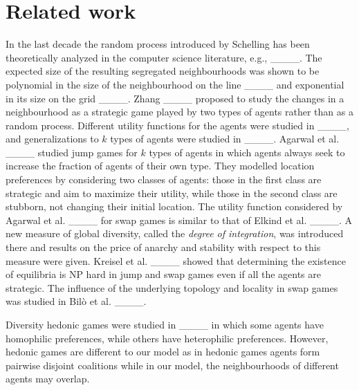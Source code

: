 \section{Related work}
\label{sec:related}

In the last decade the random process introduced by Schelling has been theoretically analyzed  in the computer science literature, e.g.,  
____. The expected size of the resulting segregated neighbourhoods was shown to be polynomial in the size of the neighbourhood on the line ____ and exponential in its size on the grid ____. 
Zhang ____ proposed to study the changes in a neighbourhood as a strategic game played by two types of agents  rather than as a random process. Different utility functions for the agents were studied in ____, and generalizations to $k$ types of agents were studied in ____.
Agarwal et al. ____ studied jump games  for $k$ types of agents in which agents always seek to increase the fraction of agents of their own type. They modelled location preferences by considering two 
classes of agents: those in the first class  are strategic and aim to maximize their utility, while those in the second class are stubborn, not 
changing their initial location.
The utility function considered by Agarwal et al. ____ for swap games is similar to that of Elkind et al. ____. 
A new measure of global diversity, called the  {\em degree of integration}, was introduced there 
and  results on the price of anarchy and stability with respect to this measure were given. 
Kreisel et al. ____ showed that determining the existence of equilibria is NP hard in jump and swap games even if all the agents are strategic. The influence of the underlying topology and locality in swap games was studied in Bil{\`o} et al. ____.

Diversity hedonic games were studied in ____ in which some agents have homophilic preferences, while others have heterophilic preferences. However, hedonic games are different to our model as in hedonic games agents form pairwise disjoint coalitions while in our model, the neighbourhoods of different agents may overlap. 


